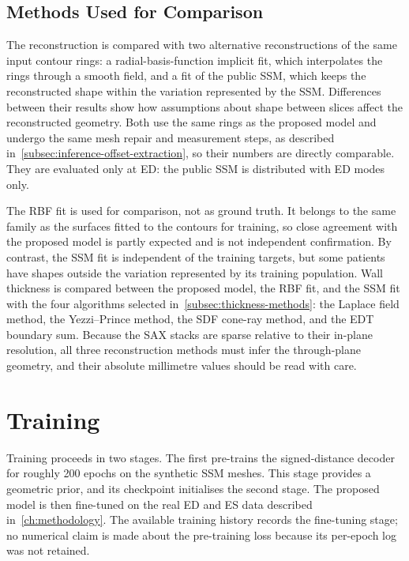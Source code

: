\subsection{Methods Used for Comparison}
\label{subsec:baselines}
\noindent
The reconstruction is compared with two
alternative reconstructions of the same input contour rings: a
radial-basis-function implicit fit, which interpolates the rings through a
smooth field, and a fit of the public SSM, which
keeps the reconstructed shape within the variation represented by the
SSM. Differences between their results show how assumptions about shape
between slices affect the reconstructed geometry. Both
use the same rings as the proposed model and undergo the same mesh repair and
measurement steps, as described in~\cref{subsec:inference-offset-extraction}, so their numbers are directly
comparable. They are evaluated only at ED: the public SSM is distributed with
ED modes only.

The RBF fit is used for comparison, not as ground truth. It belongs
to the same family as the surfaces fitted to the contours for training, so close
agreement with the proposed model is partly expected and is not independent
confirmation. By contrast, the SSM fit is independent of the training targets, but
some patients have shapes outside the variation represented by its training
population. Wall
thickness is compared between
the proposed model, the RBF fit, and the SSM fit with the four algorithms selected in~\cref{subsec:thickness-methods}: the Laplace field method, the Yezzi--Prince
method, the SDF cone-ray method, and the EDT boundary sum. Because the SAX stacks are sparse relative to their in-plane
resolution, all three reconstruction methods must infer the through-plane
geometry, and their absolute millimetre values should be read with care.

\section{Training}
\label{sec:training}
\noindent
Training proceeds in two stages. The first pre-trains
the signed-distance decoder for roughly 200 epochs on the synthetic SSM
meshes. This stage provides a geometric prior, and its checkpoint initialises
the second stage. The proposed model is then fine-tuned on the real
ED and ES data described in~\cref{ch:methodology}. The
available training history records the fine-tuning stage; no numerical claim is
made about the pre-training loss because its per-epoch log was not retained.

